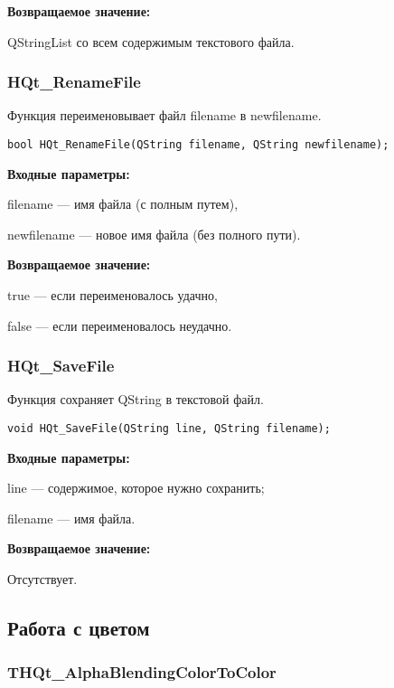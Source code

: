 \documentclass[a4paper,12pt]{article}
\begin{document}
\textbf{Возвращаемое значение:}

QStringList со всем содержимым текстового файла.


\subsubsection{HQt\_RenameFile}\label{HQt_RenameFile}

Функция переименовывает файл filename в newfilename.


\begin{lstlisting}[label=code_syntax_HQt_RenameFile,caption=Синтаксис]
bool HQt_RenameFile(QString filename, QString newfilename);
\end{lstlisting}

\textbf{Входные параметры:}

filename --- имя файла (с полным путем),
 
    newfilename --- новое имя файла (без полного пути).

\textbf{Возвращаемое значение:}

true --- если переименовалось удачно,
 
    false --- если переименовалось неудачно.


\subsubsection{HQt\_SaveFile}\label{HQt_SaveFile}

Функция сохраняет QString в текстовой файл.


\begin{lstlisting}[label=code_syntax_HQt_SaveFile,caption=Синтаксис]
void HQt_SaveFile(QString line, QString filename);
\end{lstlisting}

\textbf{Входные параметры:}

line --- содержимое, которое нужно сохранить;
 
filename --- имя файла.

\textbf{Возвращаемое значение:}

Отсутствует.


\subsection{Работа с цветом}

\subsubsection{THQt\_AlphaBlendingColorToColor}\label{THQt_AlphaBlendingColorToColor}
\end{document}
